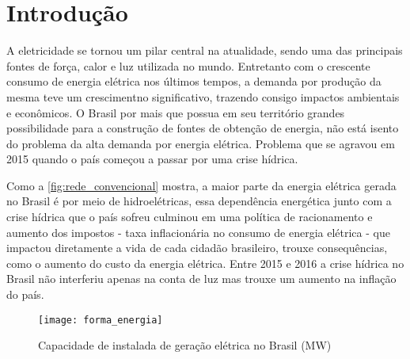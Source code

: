 \chapter[Introdução]{Introdução}
\label{ch:introdução}
A eletricidade se tornou um pilar central na atualidade, sendo uma das principais fontes de força, calor e luz utilizada no  mundo. Entretanto com o
crescente consumo de energia elétrica nos últimos tempos, a demanda por produção da mesma teve um crescimentno significativo, trazendo consigo 
impactos ambientais e econômicos. O Brasil por mais que possua em seu território grandes possibilidade para a construção de fontes de obtenção de energia, não
está isento do problema da alta demanda por energia elétrica. Problema que se agravou em 2015 quando o país começou a passar por
uma crise hídrica.

Como a \autoref{fig:rede_convencional} mostra, a maior parte da energia elétrica gerada no Brasil é por meio de hidroelétricas, essa dependência
energética junto com a crise hídrica que o país sofreu culminou em uma política de racionamento e aumento dos impostos - taxa inflacionária no
consumo de energia elétrica - que impactou diretamente a vida de cada cidadão brasileiro, trouxe consequências, como o aumento do 
custo da energia elétrica. Entre 2015 e 2016 a crise hídrica no Brasil não interferiu apenas na conta de luz mas trouxe
um aumento na inflação do país.




\begin{figure}[h!]
	\texttt{[image: forma\_energia]}
	\centering
	\caption[Capacidade de instalada de geração elétrica no Brasil (MW)]{Capacidade de instalada de geração elétrica no Brasil (MW)}
	\label{fig:rede_convencional}
\end{figure}
\FloatBarrier


